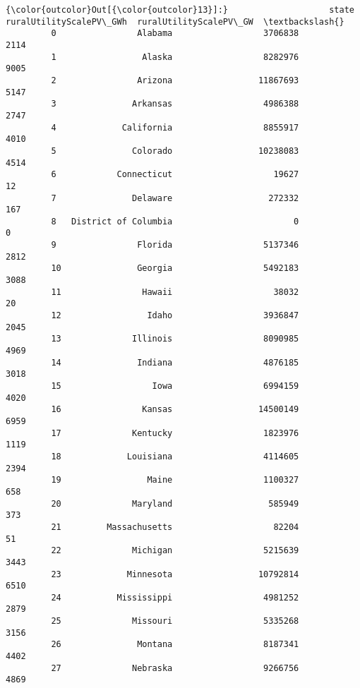 \documentclass[11pt]{article}
\begin{document}
\begin{Verbatim}[commandchars=\\\{\}]
{\color{outcolor}Out[{\color{outcolor}13}]:}                    state  ruralUtilityScalePV\_GWh  ruralUtilityScalePV\_GW  \textbackslash{}
         0                Alabama                  3706838                    2114   
         1                 Alaska                  8282976                    9005   
         2                Arizona                 11867693                    5147   
         3               Arkansas                  4986388                    2747   
         4             California                  8855917                    4010   
         5               Colorado                 10238083                    4514   
         6            Connecticut                    19627                      12   
         7               Delaware                   272332                     167   
         8   District of Columbia                        0                       0   
         9                Florida                  5137346                    2812   
         10               Georgia                  5492183                    3088   
         11                Hawaii                    38032                      20   
         12                 Idaho                  3936847                    2045   
         13              Illinois                  8090985                    4969   
         14               Indiana                  4876185                    3018   
         15                  Iowa                  6994159                    4020   
         16                Kansas                 14500149                    6959   
         17              Kentucky                  1823976                    1119   
         18             Louisiana                  4114605                    2394   
         19                 Maine                  1100327                     658   
         20              Maryland                   585949                     373   
         21         Massachusetts                    82204                      51   
         22              Michigan                  5215639                    3443   
         23             Minnesota                 10792814                    6510   
         24           Mississippi                  4981252                    2879   
         25              Missouri                  5335268                    3156   
         26               Montana                  8187341                    4402   
         27              Nebraska                  9266756                    4869   

\end{Verbatim}
\end{document}
